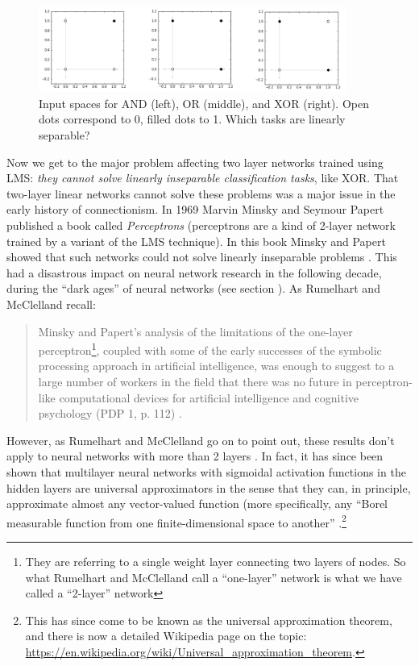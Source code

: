 \begin{figure}[h]
\centering
\includegraphics[width=0.9\textwidth]{images/booleanInputSpaces.png}
\caption[Jeff Yoshimi.]{Input spaces for AND (left), OR (middle), and XOR (right). Open dots correspond to 0, filled dots to 1. Which tasks are linearly separable?}
\label{boolean_inputspace}
\end{figure}

Now we get to the major problem affecting two layer networks trained using LMS: \emph{they cannot solve linearly inseparable classification tasks}, like XOR. That two-layer linear networks cannot solve these problems was a major issue in the early history of connectionism. In 1969 Marvin Minsky and Seymour Papert published a book called {\em Perceptrons} (perceptrons are a kind of 2-layer network trained by a variant of the LMS technique). In this book Minsky and Papert showed that such networks could not solve linearly inseparable problems \cite{minsky1969perceptrons}. This had a disastrous impact on neural network research in the following decade, during the ``dark ages'' of neural networks (see section ). As Rumelhart and McClelland recall:

\begin{quote}
Minsky and Papert's analysis of the limitations of the one-layer perceptron\footnote{They are referring to a single weight layer connecting two layers of nodes. So what Rumelhart and McClelland call a ``one-layer'' network is what we have called a ``2-layer'' network}, coupled with some of the early successes of the symbolic processing approach in artificial intelligence, was enough to suggest to a large number of workers in the field that there was no future in perceptron-like computational devices for artificial intelligence and cognitive psychology (PDP 1, p. 112) \cite{rumelhart1986parallel}.
\end{quote}

However, as Rumelhart and McClelland go on to point out, these results don't apply to neural networks with more than 2 layers \cite{rumelhart1986parallel}. In fact, it has since been shown that multilayer neural networks with sigmoidal activation functions in the hidden layers are universal approximators in the sense that they can, in principle, approximate almost any vector-valued function (more specifically, any ``Borel measurable function from one finite-dimensional space to another'' \cite{hornik1989multilayer}.\footnote{This has since come to be known as the universal approximation theorem, and there is now a detailed Wikipedia page on the topic: \url{https://en.wikipedia.org/wiki/Universal_approximation_theorem}.}


